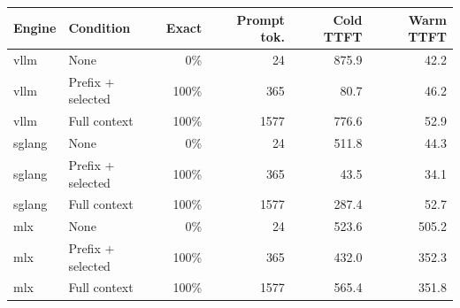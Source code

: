 \begin{tabular}{llrrrr}
\toprule
Engine & Condition & Exact & Prompt tok. & Cold TTFT & Warm TTFT \\
\midrule
vllm & None & 0\% & 24 & 875.9 & 42.2 \\
vllm & Prefix + selected & 100\% & 365 & 80.7 & 46.2 \\
vllm & Full context & 100\% & 1577 & 776.6 & 52.9 \\
sglang & None & 0\% & 24 & 511.8 & 44.3 \\
sglang & Prefix + selected & 100\% & 365 & 43.5 & 34.1 \\
sglang & Full context & 100\% & 1577 & 287.4 & 52.7 \\
mlx & None & 0\% & 24 & 523.6 & 505.2 \\
mlx & Prefix + selected & 100\% & 365 & 432.0 & 352.3 \\
mlx & Full context & 100\% & 1577 & 565.4 & 351.8 \\
\bottomrule
\end{tabular}
